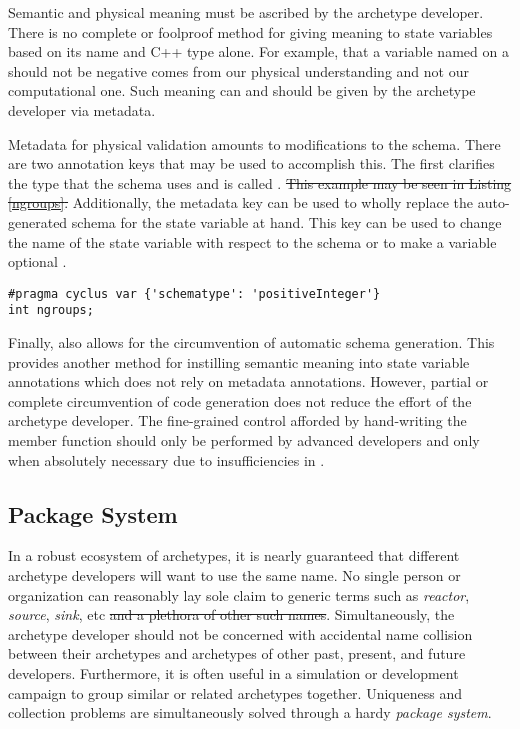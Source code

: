 Semantic and physical meaning must be ascribed by the archetype developer. There
is no complete or foolproof method for giving meaning to state variables based
on its name and C++ type alone. For example, that a variable named  
on a  should not be negative comes from our physical understanding
and not our computational one. Such meaning can and should be given by the 
archetype developer via metadata.

Metadata for physical validation amounts to modifications to the schema. There are 
two annotation keys that may be used to accomplish this.  The first clarifies the 
type that the schema uses and is called .   \sout{This example may be seen in Listing \ref{ngroups}. }
Additionally, the metadata key 
can be used to wholly replace the auto-generated schema for the state variable at 
hand. This key can be used to change the name of the state variable with respect 
to the schema or to make a variable optional .

\begin{lstlisting}[caption={Physical Constraint Addition via `schematype'}, label=ngroups]
#pragma cyclus var {'schematype': 'positiveInteger'}
int ngroups;
\end{lstlisting}

Finally, \Cyclus also allows for the circumvention of automatic schema generation. This 
provides another method for instilling semantic meaning into state variable annotations
which does not rely on metadata annotations.
However, partial or complete circumvention of code generation does not reduce 
the effort of the archetype developer. The fine-grained control afforded by 
hand-writing the  member function should only be performed 
by advanced developers and only when absolutely necessary due to insufficiencies 
in \cycpp.

\subsection{Package System}

In a robust ecosystem of archetypes, it is nearly guaranteed that different archetype
developers will want to use the same name. No single person or organization can 
reasonably lay sole claim to generic terms such as \emph{reactor}, \emph{source}, 
\emph{sink}, etc \sout{and a plethora of other such names}. Simultaneously, the archetype developer should not 
be concerned with accidental name collision between their archetypes and archetypes
of other
past, present, and future developers.  Furthermore, it is often useful in a 
simulation or 
development campaign to group similar or related archetypes together. Uniqueness
and collection problems are simultaneously solved through a hardy \emph{package system}.

